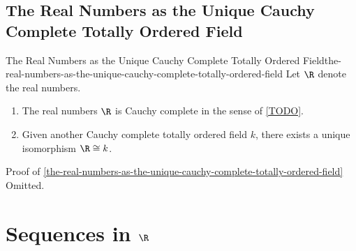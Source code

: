 \subsection{The Real Numbers as the Unique Cauchy Complete Totally Ordered Field}\label{subsection-the-real-numbers-as-the-unique-cauchy-complete-totally-ordered-field}
\begin{theorem}{The Real Numbers as the Unique Cauchy Complete Totally Ordered Field}{the-real-numbers-as-the-unique-cauchy-complete-totally-ordered-field}%
    Let $\R$ denote the real numbers.
    \begin{enumerate}
        \item\label{the-real-numbers-as-the-unique-cauchy-complete-ordered-field-1}The real numbers $\R$ is Cauchy complete in the sense of \cref{TODO}.
        \item\label{the-real-numbers-as-the-unique-cauchy-complete-ordered-field-2}Given another Cauchy complete totally ordered field $k$, there exists a unique isomorphism $\R\cong k$.
    \end{enumerate}
\end{theorem}
\begin{Proof}{Proof of \cref{the-real-numbers-as-the-unique-cauchy-complete-totally-ordered-field}}%
    Omitted.
\end{Proof}
\section{Sequences in $\R$}\label{section-sequences-in-r}
